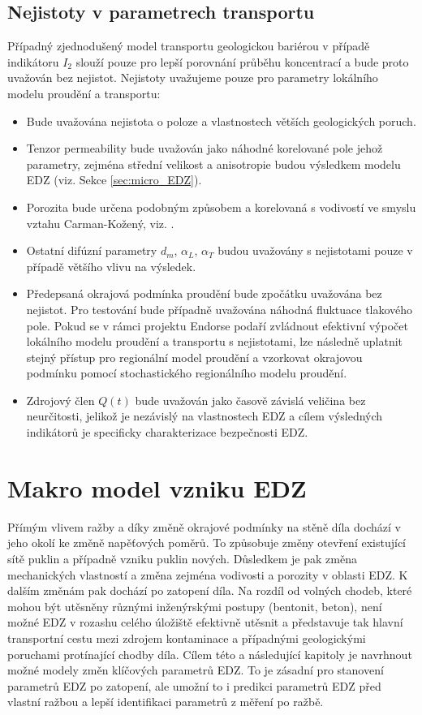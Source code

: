 \documentclass{article}
\begin{document}
\subsection{Nejistoty v parametrech transportu}
Případný zjednodušený model transportu geologickou bariérou v případě indikátoru $I_2$ slouží pouze pro lepší porovnání průběhu koncentrací a bude proto uvažován bez nejistot. Nejistoty uvažujeme pouze pro parametry lokálního modelu proudění a transportu:
\begin{itemize}
 \item Bude uvažována nejistota o poloze a vlastnostech větších geologických poruch.
 \item Tenzor permeability bude uvažován jako náhodné korelované pole jehož parametry, zejména střední velikost a anisotropie budou 
 výsledkem modelu EDZ (viz. Sekce \ref{sec:micro_EDZ}).
 \item Porozita bude určena podobným způsobem a korelovaná s vodivostí ve smyslu vztahu Carman-Kožený, viz. \cite{Carrier2003}.
 \item Ostatní difúzní parametry $d_m$, $\alpha_L$, $\alpha_T$ budou uvažovány s nejistotami pouze v případě většího vlivu na výsledek.
 \item Předepsaná okrajová podmínka proudění bude zpočátku uvažována bez nejistot. Pro testování bude případně uvažována náhodná fluktuace tlakového pole. Pokud se v rámci projektu Endorse podaří zvládnout efektivní výpočet lokálního modelu proudění a transportu s nejistotami, lze následně uplatnit stejný přístup pro regionální model proudění a vzorkovat okrajovou podmínku pomocí stochastického regionálního modelu proudění.
 \item Zdrojový člen $Q(t)$ bude uvažován jako časově závislá veličina bez neurčitosti, jelikož 
 je nezávislý na vlastnostech EDZ a cílem výsledných indikátorů je specificky charakterizace bezpečnosti EDZ.
\end{itemize}

\section{Makro model vzniku EDZ}
\label{sec:model_EDZ}

Přímým vlivem ražby a díky změně okrajové podmínky na stěně díla dochází v jeho okolí ke změně napěťových poměrů. To způsobuje změny otevření 
existující sítě puklin a případně vzniku puklin nových. Důsledkem je pak změna mechanických vlastností a změna zejména vodivosti a 
porozity v oblasti EDZ. K dalším změnám pak dochází po zatopení díla. Na rozdíl od volných chodeb, které mohou být utěsněny různými inženýrskými postupy (bentonit, beton), není možné EDZ v rozashu celého úložiště efektivně utěsnit a představuje tak hlavní transportní cestu mezi zdrojem kontaminace 
a případnými geologickými poruchami protínající chodby díla. 
Cílem této a následující kapitoly je navrhnout možné modely změn klíčových parametrů EDZ. To je zásadní pro stanovení parametrů EDZ po zatopení, ale
umožní to i predikci parametrů EDZ před vlastní ražbou a lepší identifikaci parametrů z měření po ražbě.
\end{document}
